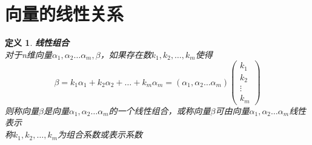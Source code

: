 \documentclass[12pt,oneside]{ctexbook}
\newtheorem{definition}[subsection]{定义}
\begin{document}
\section{向量的线性关系}
\begin{definition}
    \textbf{线性组合}\\
    对于n维向量\(\alpha_1,\alpha_2 \dots \alpha_m,\beta \)，如果存在数\(k_1,k_2,\dots,k_m\)使得
    \[\beta = k_1\alpha_1 + k_2\alpha_2 + \dots + k_m\alpha_m = (\alpha_1,\alpha_2 \dots \alpha_m)
    \begin{pmatrix}
        k_1
        \\k_2
        \\ \vdots
        \\k_m
    \end{pmatrix}
    \]
    则称向量\(\beta\)是向量\(\alpha_1,\alpha_2 \dots \alpha_m\)的一个线性组合，或称向量\(\beta\)可由向量\(\alpha_1,\alpha_2 \dots \alpha_m\)线性表示
    \\称\(k_1,k_2,\dots,k_m\)为组合系数或表示系数
\end{definition}
\end{document}
